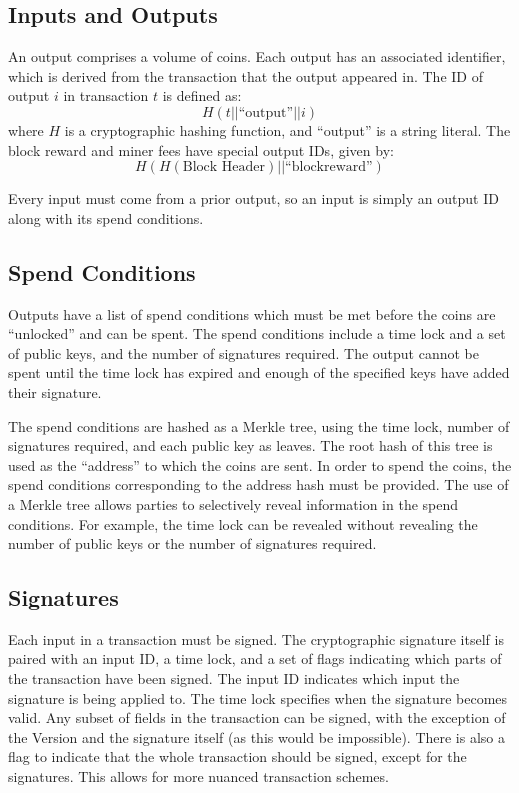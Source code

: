\documentclass[twocolumn]{article}
\begin{document}
\subsection{Inputs and Outputs}
An output comprises a volume of coins.
Each output has an associated identifier, which is derived from the transaction that the output appeared in.
The ID of output $i$ in transaction $t$ is defined as:
\[
	H(t || \text{``output''} || i)
\]
where $H$ is a cryptographic hashing function, and ``output'' is a string literal.
The block reward and miner fees have special output IDs, given by:
\[
	H(H(\text{Block Header}) || \text{``blockreward''})
\]

Every input must come from a prior output, so an input is simply an output ID along with its spend conditions.

\subsection{Spend Conditions}
Outputs have a list of spend conditions which must be met before the coins are ``unlocked'' and can be spent.
The spend conditions include a time lock and a set of public keys, and the number of signatures required.
The output cannot be spent until the time lock has expired and enough of the specified keys have added their signature.

The spend conditions are hashed as a Merkle tree, using the time lock, number of signatures required, and each public key as leaves.
The root hash of this tree is used as the ``address'' to which the coins are sent.
In order to spend the coins, the spend conditions corresponding to the address hash must be provided.
The use of a Merkle tree allows parties to selectively reveal information in the spend conditions.
For example, the time lock can be revealed without revealing the number of public keys or the number of signatures required. %

\subsection{Signatures}
Each input in a transaction must be signed.
The cryptographic signature itself is paired with an input ID, a time lock, and a set of flags indicating which parts of the transaction have been signed.
The input ID indicates which input the signature is being applied to.
The time lock specifies when the signature becomes valid.
Any subset of fields in the transaction can be signed, with the exception of the Version and the signature itself (as this would be impossible).
There is also a flag to indicate that the whole transaction should be signed, except for the signatures.
This allows for more nuanced transaction schemes.
\end{document}
